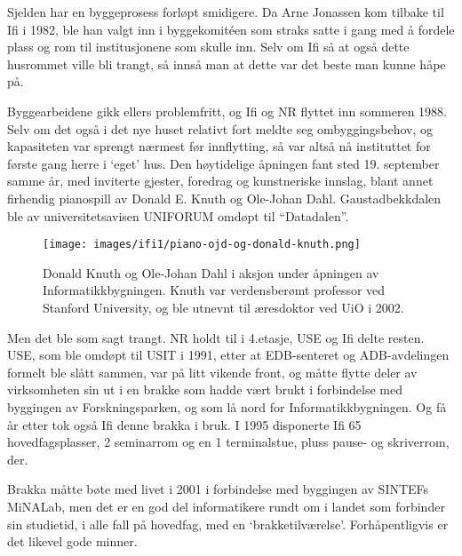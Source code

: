Sjelden har en byggeprosess forløpt smidigere. Da Arne Jonassen kom tilbake til Ifi i 1982, ble han valgt inn i byggekomitéen som straks satte i gang med å fordele plass og rom til institusjonene som skulle inn. Selv om Ifi så at også dette husrommet ville bli trangt, så innså man at dette var det beste man kunne håpe på.

Byggearbeidene gikk ellers problemfritt, og Ifi og NR flyttet inn sommeren 1988. Selv om det også i det nye huset relativt fort meldte seg ombyggingsbehov, og kapasiteten var sprengt nærmest før innflytting, så var altså nå instituttet for første gang herre i `eget' hus. Den høytidelige åpningen fant sted 19. september samme år, med inviterte gjester, foredrag og kunstneriske innslag, blant annet firhendig pianospill av Donald E. Knuth og Ole-Johan Dahl. Gaustadbekkdalen ble av universitetsavisen UNIFORUM omdøpt til ``Datadalen''.

\begin{figure}
	\texttt{[image: images/ifi1/piano-ojd-og-donald-knuth.png]}
	\caption{Donald Knuth og Ole-Johan Dahl i aksjon under åpningen av Informatikkbygningen. Knuth var verdensberømt professor ved Stanford University, og ble utnevnt til æresdoktor ved UiO i 2002.}
\end{figure}

Men det ble som sagt trangt. NR holdt til i 4.etasje, USE og Ifi delte resten. USE, som ble omdøpt til USIT i 1991, etter at EDB-senteret og ADB-avdelingen formelt ble slått sammen, var på litt vikende front, og måtte flytte deler av virksomheten sin ut i en brakke som hadde vært brukt i forbindelse med byggingen av Forskningsparken, og som lå nord for Informatikkbygningen. Og få år etter tok også Ifi denne brakka i bruk. I 1995 disponerte Ifi 65 hovedfagsplasser, 2 seminarrom og en 1 terminalstue, pluss pause- og skriverrom, der. 

Brakka måtte bøte med livet i 2001 i forbindelse med byggingen av SINTEFs MiNALab, men det er en god del informatikere rundt om i landet som forbinder sin studietid, i alle fall på hovedfag, med en `brakketilværelse'. Forhåpentligvis er det likevel gode minner.
